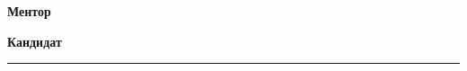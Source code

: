 \begin{titlepage}
\begin{center}
\begin{minipage}[t]{.49\textwidth}
    \large \textbf{Ментор}\par 
    \ProjectMentor
\end{minipage}
\hfill
\begin{minipage}[t]{.45\textwidth}
    \large \hfill\textbf{Кандидат}\par 
    \hfill \ProjectCandidate \par
    \hfill \ProjectCandidateIndex
\end{minipage}

\vspace{1cm}
\rule{\textwidth}{0.5mm}
{\large \ProjectDate \vspace{-2mm}} 
\end{center}
        
\end{titlepage}
    